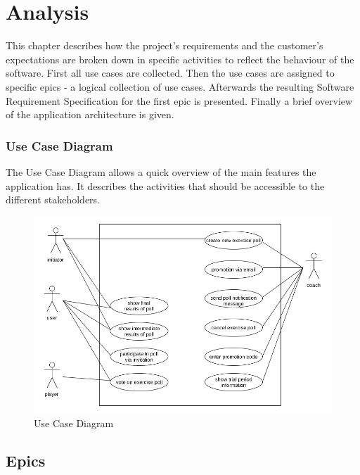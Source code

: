 \section{Analysis}
\label{sec:analysis}

This chapter describes how the project's requirements and the customer's expectations are broken down in specific activities to reflect the behaviour of the software.
First all use cases are collected. Then the use cases are assigned to specific epics - a logical collection of use cases. Afterwards the resulting Software Requirement Specification for the first epic is presented. Finally a brief overview of the application architecture is given.

\subsubsection{Use Case Diagram}
\label{sssec:use_case_diagram}

The Use Case Diagram allows a quick overview of the main features the application has. It describes the activities that should be accessible to the different stakeholders.

\begin{figure}[H]
    \begin{center}
        \includegraphics[width=\textwidth]{images/ucd.png}
        \caption{Use Case Diagram}
        \label{fig:ucd}
    \end{center}
\end{figure}

\subsection{Epics}
\label{ssec:epics}

